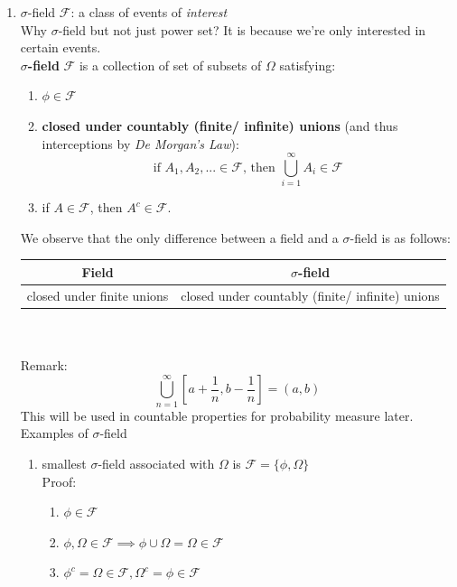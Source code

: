 \documentclass[11pt]{article}
\begin{document}
\begin{enumerate}
\item $\sigma$-field $\mathcal{F}$: a class of events of \emph{interest} \\
Why $\sigma$-field but not just power set? It is because we're only interested in certain events.\\ 
\textbf{$\sigma$-field} $\mathcal{F}$ is a collection of set of subsets of $\Omega$ satisfying:
\begin{enumerate}
\item $\phi \in \mathcal{F}$
\item \textbf{closed under countably (finite/ infinite) unions} (and thus interceptions by \textit{De Morgan's Law}): $$\text{if } A_1, A_2, ... \in \mathcal{F}\text{, then } \bigcup\limits_{i=1}^{\infty} A_i \in \mathcal{F}$$
\item if $A \in \mathcal{F}$, then $A^{c} \in \mathcal{F}$.
\end{enumerate}
We observe that the only difference between a field and a $\sigma$-field is as follows:\\
\begin{tabular}{|c|c|}
\hline
Field& $\sigma$-field\\
\hline
closed under finite unions& closed under countably (finite/ infinite) unions\\
\hline
\end{tabular}\\\\
Remark: $$\bigcup_{n=1}^{\infty} [a+\dfrac{1}{n}, b-\dfrac{1}{n}]=(a, b)$$
This will be used in countable properties for probability measure later.
Examples of $\sigma$-field
\begin{enumerate}
\item smallest $\sigma$-field associated with $\Omega$ is $\mathcal{F}=\{ \phi, \Omega\}$\\
Proof: \begin{enumerate}
\item $\phi \in \mathcal{F}$
\item $\phi ,\Omega \in \mathcal{F} \implies \phi \cup \Omega = \Omega \in \mathcal{F}$
\item $\phi ^c = \Omega \in \mathcal{F}, \Omega ^c = \phi \in \mathcal{F}$
\end{enumerate}


\end{enumerate}
\end{enumerate}
\end{document}
